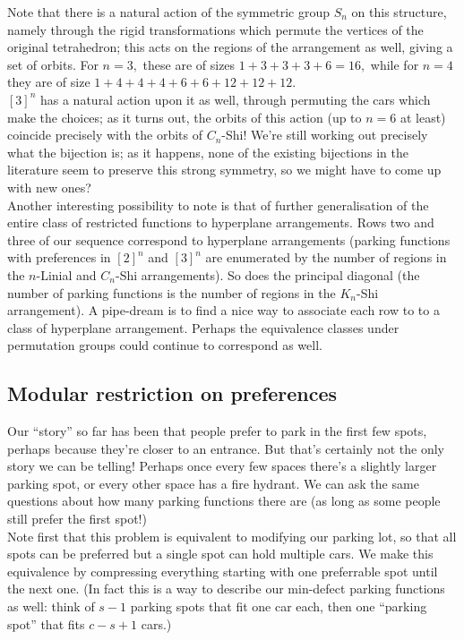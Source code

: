 Note that there is a natural action of the symmetric group $S_n$ on this structure, namely through the rigid transformations which permute the vertices of the original tetrahedron; this acts on the regions of the arrangement as well, giving a set of orbits. For $n=3,$ these are of sizes $1+3+3+3+6=16,$ while for $n=4$ they are of size $1+4+4+4+6+6+12+12+12.$\\

$[3]^n$ has a natural action upon it as well, through permuting the cars which make the choices; as it turns out, the orbits of this action (up to $n=6$ at least) coincide precisely with the orbits of $C_n$-Shi! We're still working out precisely what the bijection is; as it happens, none of the existing bijections in the literature seem to preserve this strong symmetry, so we might have to come up with new ones? \\

Another interesting possibility to note is that of further generalisation of the entire class of restricted functions to hyperplane arrangements. Rows two and three of our sequence correspond to hyperplane arrangements (parking functions with preferences in $[2]^{n}$ and $[3]^n$ are enumerated by the number of regions in the $n$-Linial and $C_{n}$-Shi arrangements). So does the principal diagonal (the number of parking functions is the number of regions in the $K_{n}$-Shi arrangement). A pipe-dream is to find a nice way to associate each row to to a class of hyperplane arrangement. Perhaps the equivalence classes under permutation groups could continue to correspond as well.

\subsection*{Modular restriction on preferences}

Our ``story'' so far has been that people prefer to park in the first few spots, perhaps because they're closer to an entrance. But that's certainly not the only story we can be telling! Perhaps once every few spaces there's a slightly larger parking spot, or every other space has a fire hydrant. We can ask the same questions about how many parking functions there are (as long as some people still prefer the first spot!)\\

Note first that this problem is equivalent to modifying our parking lot, so that all spots can be preferred but a single spot can hold multiple cars. We make this equivalence by compressing everything starting with one preferrable spot until the next one. (In fact this is a way to describe our min-defect parking functions as well: think of $s-1$ parking spots that fit one car each, then one ``parking spot'' that fits $c-s+1$ cars.)\\

